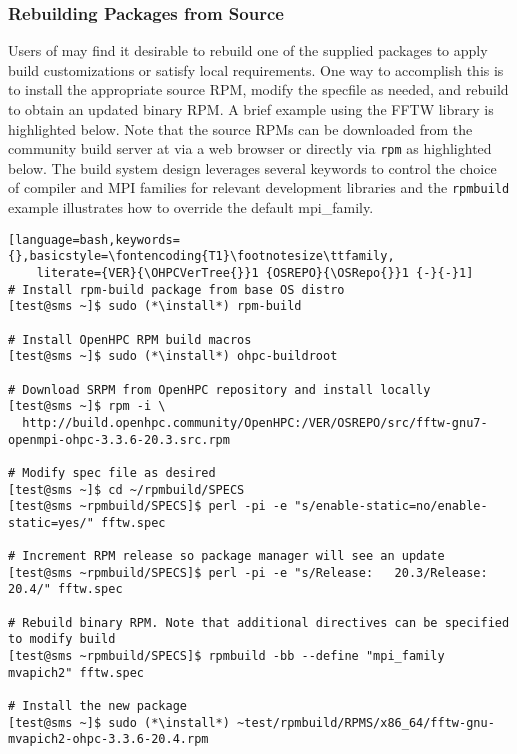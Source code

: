 \clearpage
\subsubsection{Rebuilding Packages from Source}  \label{appendix:rpmbuild}

Users of \OHPC{} may find it desirable to rebuild one of the supplied packages
to apply build customizations or satisfy local requirements. One way to
accomplish this is to install the appropriate source RPM, modify the specfile
as needed, and rebuild to obtain an updated binary RPM. A brief example using
the FFTW library is highlighted below.  Note that the source RPMs can be downloaded from the
community build server at \href{https://build.openhpc.community}
{\color{blue}{https://build.openhpc.community}} via a web browser or directly
via \texttt{rpm} as highlighted below. The \OHPC{} build system design
leverages several keywords to control the choice of compiler and MPI families
for relevant development libraries and the \texttt{rpmbuild} example
illustrates how to override the default mpi\_family.

\begin{lstlisting}[language=bash,keywords={},basicstyle=\fontencoding{T1}\footnotesize\ttfamily,
    literate={VER}{\OHPCVerTree{}}1 {OSREPO}{\OSRepo{}}1 {-}{-}1]
# Install rpm-build package from base OS distro
[test@sms ~]$ sudo (*\install*) rpm-build

# Install OpenHPC RPM build macros
[test@sms ~]$ sudo (*\install*) ohpc-buildroot

# Download SRPM from OpenHPC repository and install locally
[test@sms ~]$ rpm -i \
  http://build.openhpc.community/OpenHPC:/VER/OSREPO/src/fftw-gnu7-openmpi-ohpc-3.3.6-20.3.src.rpm

# Modify spec file as desired
[test@sms ~]$ cd ~/rpmbuild/SPECS
[test@sms ~rpmbuild/SPECS]$ perl -pi -e "s/enable-static=no/enable-static=yes/" fftw.spec

# Increment RPM release so package manager will see an update
[test@sms ~rpmbuild/SPECS]$ perl -pi -e "s/Release:   20.3/Release:   20.4/" fftw.spec

# Rebuild binary RPM. Note that additional directives can be specified to modify build
[test@sms ~rpmbuild/SPECS]$ rpmbuild -bb --define "mpi_family mvapich2" fftw.spec

# Install the new package
[test@sms ~]$ sudo (*\install*) ~test/rpmbuild/RPMS/x86_64/fftw-gnu-mvapich2-ohpc-3.3.6-20.4.rpm
\end{lstlisting}
